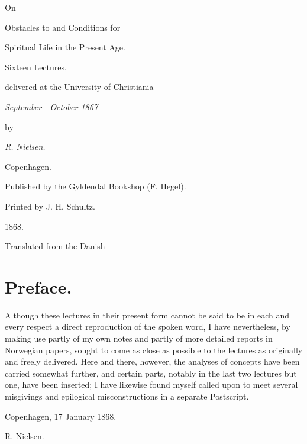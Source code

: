 \documentclass[12pt]{book}
\begin{document}
\frontmatter
\begin{titlepage}
\centering
On\par
{\Large Obstacles to and Conditions for}\par
{\LARGE Spiritual Life in the Present Age.}\par
\bigskip
{\large Sixteen Lectures,}\par
delivered at the University of Christiania\par
\emph{September---October 1867}\par
\medskip
by\par
\emph{R. Nielsen.}\par
\vfill
\vfill
Copenhagen.\par
Published by the Gyldendal Bookshop (F. Hegel).\par
{\small Printed by J. H. Schultz.}\par
1868.\par
\bigskip
{\small Translated from the Danish}\par
\end{titlepage}

\chapter*{Preface.}

Although these lectures in their present form cannot be said to be in
each and every respect a direct reproduction of the spoken word, I have
nevertheless, by making use partly of my own notes and partly of more
detailed reports in Norwegian papers, sought to come as close as possible
to the lectures as originally and freely delivered. Here and there,
however, the analyses of concepts have been carried somewhat further, and
certain parts, notably in the last two lectures but one, have been
inserted; I have likewise found myself called upon to meet several
misgivings and epilogical misconstructions in a separate Postscript.

\medskip
\noindent\hspace*{2em}Copenhagen, 17 January 1868.

\begin{flushright}
R. Nielsen.
\end{flushright}
\end{document}
